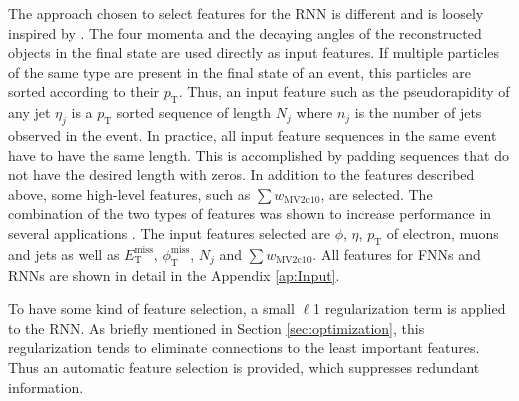 The approach chosen to select features for the RNN is different and is loosely inspired by \cite{RNNSel}. The four momenta and the decaying angles of the reconstructed objects in the final state are used directly as input features. If multiple particles of the same type are present in the final state of an event, this particles are sorted according to their $p_{\text{T}}$. Thus, an input feature such as the pseudorapidity of any jet $\eta_j$ is a $p_{\text{T}}$ sorted sequence of length $N_j$ where $n_j$ is the number of jets observed in the event.  In practice, all input feature sequences in the same event have to have the same length. This is accomplished by padding sequences that do not have the desired length with zeros. In addition to the features described above, some high-level features, such as $\sum w_{\text{MV2c10}}$, are selected. The combination of the two types of features was shown to increase performance in several applications \cite{SpeFea1,SpeFea2}. The input features selected are $\phi$, $\eta$, $p_{\text{T}}$ of electron, muons and jets as well as $E_{\text{T}}^{\text{miss}}$, $\phi_{\text{T}}^{\text{miss}}$, $N_j$ and $\sum w_{\text{MV2c10}}$. All features for FNNs and RNNs are shown in detail in the Appendix \ref{ap:Input}.

\newpage

To have some kind of feature selection, a small $\ell$1 regularization term is applied to the RNN. As briefly mentioned in Section \ref{sec:optimization}, this regularization tends to eliminate connections to the least important features. Thus an automatic feature selection is provided, which suppresses redundant information.

%
%
%


